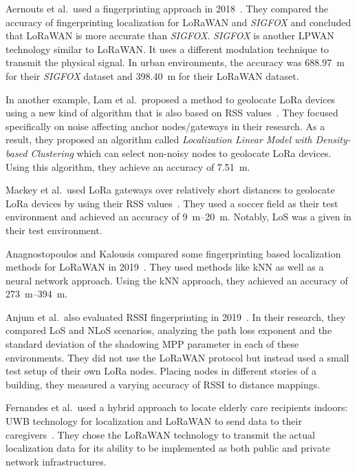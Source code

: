 Aernouts et al.\ used a fingerprinting approach in 2018~\cite{aernouts_sigfox_2018}.
They compared the accuracy of fingerprinting localization for \ac{LoRaWAN} and \emph{SIGFOX} and concluded that \ac{LoRaWAN} is more accurate than \emph{SIGFOX}.
\emph{SIGFOX} is another \ac{LPWAN} technology similar to \ac{LoRaWAN}.
It uses a different modulation technique to transmit the physical signal.
In urban environments, the accuracy was \SI{688.97}{\meter} for their \emph{SIGFOX} dataset and \SI{398.40}{\meter} for their LoRaWAN dataset.

In another example, Lam et al.~proposed a method to geolocate \ac{LoRa} devices using a new kind of algorithm that is also based on \ac{RSS} values~\cite{lam_new_2018}.
They focused specifically on noise affecting anchor nodes/gateways in their research.
As a result, they proposed an algorithm called \emph{Localization Linear Model with Density-based Clustering} which can select non-noisy nodes to geolocate \ac{LoRa} devices.
Using this algorithm, they achieve an accuracy of \SI{7.51}{\meter}.

Mackey et al.~used \ac{LoRa} gateways over relatively short distances to geolocate \ac{LoRa} devices by using their \ac{RSS} values~\cite{mackey_lora-based_2019}.
They used a soccer field as their test environment and achieved an accuracy of \SIrange{9}{20}{\meter}.
Notably, \ac{LoS} was a given in their test environment.

Anagnostopoulos and Kalousis compared some fingerprinting based localization methods for \ac{LoRaWAN} in 2019~\cite{anagnostopoulos_reproducible_2019}.
They used methods like \ac{kNN} as well as a neural network approach.
Using the \ac{kNN} approach, they achieved an accuracy of \SIrange{273}{394}{\meter}.

Anjum et al.\ also evaluated \ac{RSSI} fingerprinting in 2019~\cite{anjum_analysis_2019}.
In their research, they compared \ac{LoS} and \ac{NLoS} scenarios, analyzing the path loss exponent and the standard deviation of the shadowing \ac{MPP} parameter in each of these environments.
They did not use the \ac{LoRaWAN} protocol but instead used a small test setup of their own \ac{LoRa} nodes.
Placing nodes in different stories of a building, they measured a varying accuracy of \ac{RSSI} to distance mappings.

Fernandes et al.\ used a hybrid approach to locate elderly care recipients indoors: \ac{UWB} technology for localization and \ac{LoRaWAN} to send data to their caregivers~\cite{fernandes_hybrid_2020}.
They chose the \ac{LoRaWAN} technology to transmit the actual localization data for its ability to be implemented as both public and private network infrastructures.

